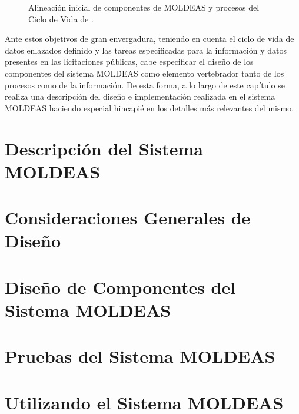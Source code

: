 \begin{figure}[h]
\centering
{}
    \caption{Alineación inicial de componentes de MOLDEAS y procesos del Ciclo de Vida de \linkeddata.}
 \label{fig:com}
\end{figure}

Ante estos objetivos de gran envergadura, teniendo en cuenta el ciclo de vida de datos enlazados definido y las tareas 
especificadas para la información y datos presentes en las licitaciones públicas, cabe especificar el diseño 
de los componentes del sistema MOLDEAS como elemento vertebrador tanto de los procesos como de la información. De esta forma, 
a lo largo de este capítulo se realiza una descripción del diseño e implementación realizada en el sistema MOLDEAS haciendo 
especial hincapié en los detalles más relevantes del mismo.
\section{Descripción del Sistema MOLDEAS}

\section{Consideraciones Generales de Diseño}

\section{Diseño de Componentes del Sistema MOLDEAS}

\section{Pruebas del Sistema MOLDEAS}\label{sect:pruebas-moldeas}

\section{Utilizando el Sistema MOLDEAS}

